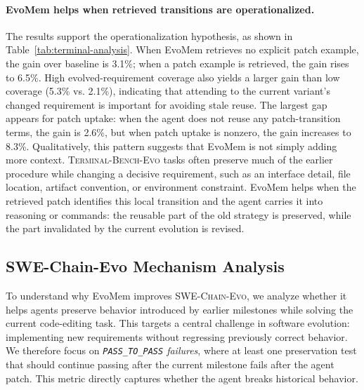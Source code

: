\documentclass{llmxive}
\begin{document}
\paragraph{EvoMem helps when retrieved transitions are operationalized.}
The results support the operationalization hypothesis, as shown in Table~\ref{tab:terminal-analysis}. When EvoMem retrieves no explicit patch example, the gain over baseline is 3.1\%; when a patch example is retrieved, the gain rises to 6.5\%. High evolved-requirement coverage also yields a larger gain than low coverage (5.3\% vs. 2.1\%), indicating that attending to the current variant's changed requirement is important for avoiding stale reuse. The largest gap appears for patch uptake: when the agent does not reuse any patch-transition terms, the gain is 2.6\%, but when patch uptake is nonzero, the gain increases to 8.3\%. Qualitatively, this pattern suggests that EvoMem is not simply adding more context. \textsc{Terminal-Bench-Evo} tasks often preserve much of the earlier procedure while changing a decisive requirement, such as an interface detail, file location, artifact convention, or environment constraint. EvoMem helps when the retrieved patch identifies this local transition and the agent carries it into reasoning or commands: the reusable part of the old strategy is preserved, while the part invalidated by the current evolution is revised.









\subsection{SWE-Chain-Evo Mechanism Analysis}

To understand why EvoMem improves \textsc{SWE-Chain-Evo}, we analyze whether it helps agents preserve behavior introduced by earlier milestones while solving the current code-editing task. This targets a central challenge in software evolution: implementing new requirements without regressing previously correct behavior. We therefore focus on \emph{\texttt{PASS\_TO\_PASS} failures}, where at least one preservation test that should continue passing after the current milestone fails after the agent patch. This metric directly captures whether the agent breaks historical behavior.
\end{document}
